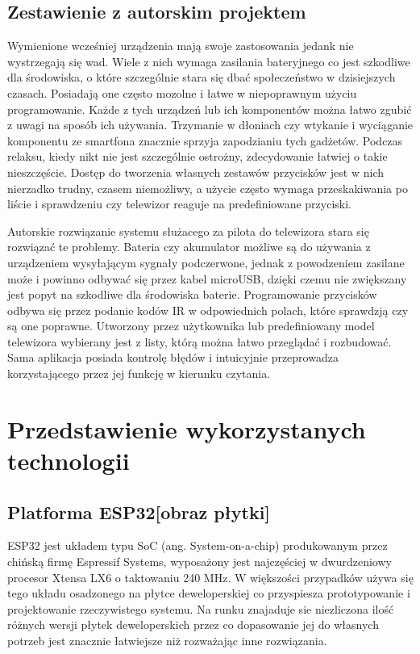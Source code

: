 \documentclass[12pt,twoside,draft]{article}
\begin{document}
\subsection{Zestawienie z autorskim projektem}
{Wymienione wcześniej urządzenia mają swoje zastosowania jedank nie wystrzegają się wad. 
Wiele z nich wymaga zasilania bateryjnego co jest szkodliwe dla środowiska, o które szczególnie
stara się dbać społeczeństwo w dzisiejszych czasach. Posiadają one często mozolne i łatwe w niepoprawnym użyciu 
programowanie. Każde z tych urządzeń lub ich komponentów można łatwo zgubić z uwagi na sposób 
ich używania. Trzymanie w dłoniach czy wtykanie i wyciąganie komponentu ze smartfona znacznie
sprzyja zapodzianiu tych gadżetów. Podczas relaksu, kiedy nikt nie jest szczególnie 
ostrożny, zdecydowanie łatwiej o takie nieszczęście. Dostęp do tworzenia własnych 
zestawów przycisków jest w nich nierzadko trudny, czasem niemożliwy, a użycie często wymaga 
przeskakiwania po liście i sprawdzeniu czy telewizor reaguje na predefiniowane przyciski.

Autorskie rozwiązanie systemu służacego za pilota do telewizora stara się rozwiązać te problemy. Bateria czy akumulator możliwe 
są do używania z urządzeniem wysyłającym sygnały podczerwone, jednak z powodzeniem zasilane może i powinno odbywać się przez 
kabel microUSB, dzięki czemu nie zwiększany jest popyt na szkodliwe dla środowiska baterie. Programowanie przycisków
odbywa się przez podanie kodów IR w odpowiednich polach, które sprawdzją czy są one poprawne. Utworzony przez użytkownika lub predefiniowany
 model telewizora wybierany jest z listy, którą można łatwo przeglądać i rozbudować. Sama aplikacja posiada kontrolę błędów
 i intuicyjnie przeprowadza korzystającego przez jej funkcję w kierunku czytania.
}
\clearpage
\section{Przedstawienie wykorzystanych technologii}
\subsection{Platforma ESP32[obraz płytki]}
ESP32 jest układem typu SoC (ang. System-on-a-chip) produkowanym przez chińską firmę Espressif Systems, 
wyposażony jest najczęściej w dwurdzeniowy procesor Xtensa LX6 o taktowaniu 240 MHz. W większości przypadków używa się
tego układu osadzonego na płytce deweloperskiej co przyspiesza prototypowanie i projektowanie rzeczywistego 
systemu. Na runku znajaduje sie niezliczona ilość różnych wersji płytek deweloperskich przez co dopasowanie
jej do własnych potrzeb jest znacznie łatwiejsze niż rozważając inne rozwiązania.
\end{document}
